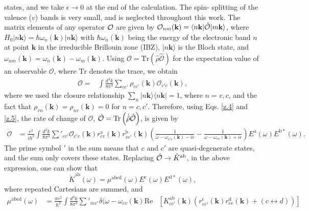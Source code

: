 \documentclass[floatfix,prb,aps,superscriptaddress,showpacs,11pt,preprint,letterpaper]{revtex4}
\begin{document}
states, and we take $\epsilon\to 0$ at the end of the calculation. The spin-
splitting of the valence ($v$) bands is very small, and is neglected throughout
this work.\cite{nastosPRB07} The matrix elements of any operator ${\cal O}$ are
given by ${\cal O}_{nm}({\mathbf k})=\langle n{\mathbf k}|\hat{\cal O}|
m{\mathbf k}\rangle$, where $H_{0}|n{\mathbf k}\rangle = \hbar
\omega_{n}({\mathbf k})|n{\mathbf k}\rangle$ with $\hbar \omega_{n}({\mathbf
k})$ being the energy of the electronic band $n$ at point ${\mathbf k}$ in the
irreducible Brillouin zone (IBZ),  $|n{\mathbf k}\rangle$ is the Bloch state,
and $\omega_{nm}({\mathbf k})=\omega_{n}({\mathbf k})-\omega_{m}({\mathbf k})$.
Using $\mathcal{O} = \mathrm{Tr}(\hat{\rho}\hat{\mathcal{O}})$ for the
expectation value of an observable $\mathcal{O}$, where $\mathrm{Tr}$ denotes
the trace, we obtain
\begin{align}\label{z.5}
\mathcal{O} = & 
\int \frac{d^{3}k}{8\pi^{3}} \sum_{cc'} \rho_{cc'}({\mathbf k}) 
\mathcal{O}_{c'c}({\mathbf k}),
\end{align}
where we used the closure relationship $\sum_{n}|n{\mathbf k}\rangle \langle
n{\mathbf k}| = 1$, where $n=v,c$, and the fact that $\rho_{vn}({\mathbf
k})=\rho_{nv}({\mathbf k})=0$ for $n=c,c'$. Therefore, using  Eqs. \eqref{z.4}
and \eqref{z.5}, the rate of change of $\mathcal{O}$, $\dot{\mathcal{O}} =
\mathrm{Tr} \left( \dot{\hat\rho} \hat{\cal O} \right)$, is given by
\begin{align}
\dot{\mathcal{O}} 
&=\frac{e^{2}}{i\hbar^{2}} \int \frac{d^{3}k}{8\pi^{3}} 
\sum'_{cc'} \mathcal{O}_{c'c}({\mathbf k}) 
r^{\mathrm{a}}_{cv}({\mathbf k})  r^{\mathrm{b}}_{vc'}({\mathbf k})  
\left( \frac{1}{\omega - \omega_{c'v}({\mathbf k})  - i\epsilon} - 
\frac{1}{\omega - \omega_{cv}({\mathbf k})  + i\epsilon} \right)
E^{\mathrm{a}}(\omega) E^{\mathrm{b*}}(\omega)
\label{eq:dotO}
.
\end{align}
The prime symbol $'$ in the sum means that $c$ and $c'$ are quasi-degenerate
states, and the sum only covers these states. Replacing  $\hat{\cal O}
\rightarrow \hat{K}^{\mathrm{ab}}$, in the above expression, one can show that
\begin{equation}
\dot{K}^{\mathrm{ab}}(\omega) =
\mu^{\mathrm{abcd}}(\omega)
E^{\mathrm{c}}(\omega) E^{\mathrm{d*}}(\omega),
\label{eq:dotk}
\end{equation}
where repeated Cartesians are summed, and 
\begin{equation}\label{eq:mu}
\begin{aligned}
\mu^{\mathrm{abcd}}  (\omega) &
=
\frac{\pi e^{2}}{\hbar^{2}} \int 
\frac{d^{3}k}{8 \pi^{3}} \sum'_{vcc'}
\delta(\omega-\omega_{cv}({\mathbf k}) 
\mathrm{Re} & \left[ K^{\mathrm{ab}}_{cc'}({\mathbf k}) 
\left(  
r^{\mathrm{c}}_{vc'}({\mathbf k})   
r^{\mathrm{d}}_{cv }({\mathbf k})  +
(c \leftrightarrow d)  
\right) 
\right]
\end{aligned}
\end{equation} 
\end{document}
